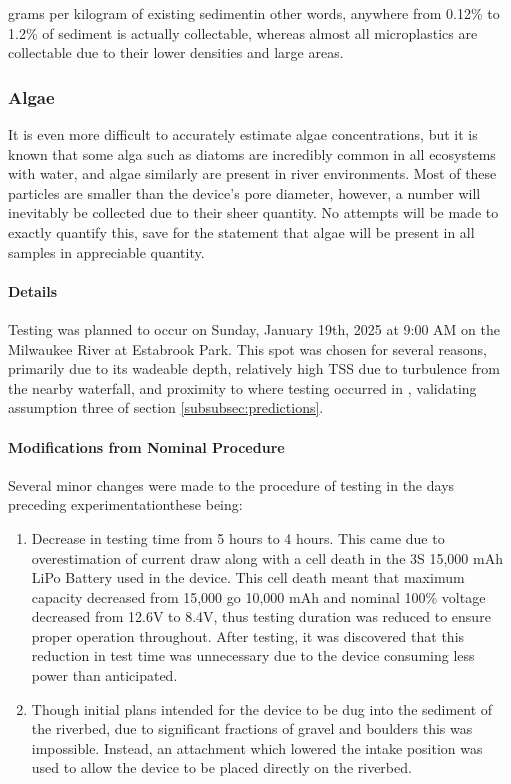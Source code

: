 \documentclass[fleqn,10pt]{SelfArx} %
\begin{document}
grams per kilogram of existing sediment\textemdash in other words, anywhere from 0.12\% to 1.2\% of sediment is actually collectable, whereas almost all microplastics are collectable due to their lower densities and large areas.
	\subsubsection{Algae}
	It is even more difficult to accurately estimate algae concentrations, but it is known that some alga such as diatoms are incredibly common in all ecosystems with water, and algae similarly are present in river environments. Most of these particles are smaller than the device's pore diameter, however, a number will inevitably be collected due to their sheer quantity. No attempts will be made to exactly quantify this, save for the statement that algae will be present in all samples in appreciable quantity. 
	\paragraph*{Details}
	Testing was planned to occur on Sunday, January 19th, 2025 at 9:00 AM on the Milwaukee River at Estabrook Park. This spot was chosen for several reasons, primarily due to its wadeable depth, relatively high TSS due to turbulence from the nearby waterfall, and proximity to where testing occurred in \cite{LenakerEtAlvertdist}, validating assumption three of section \ref{subsubsec:predictions}. 
	\paragraph*{Modifications from Nominal Procedure}
	\label{sec:mods}
	Several minor changes were made to the procedure of testing in the days preceding experimentation\textemdash these being:
	\begin{enumerate}
		\item Decrease in testing time from 5 hours to 4 hours. This came due to overestimation of current draw along with a cell death in the 3S 15,000 mAh LiPo Battery used in the device. This cell death meant that maximum capacity decreased from 15,000 go 10,000 mAh and nominal 100\% voltage decreased from 12.6V to 8.4V, thus testing duration was reduced to ensure proper operation throughout. After testing, it was discovered that this reduction in test time was unnecessary due to the device consuming less power than anticipated. 
		\item Though initial plans intended for the device to be dug into the sediment of the riverbed, due to significant fractions of gravel and boulders this was impossible. Instead, an attachment which lowered the intake position was used to allow the device to be placed directly on the riverbed. 
	\end{enumerate}
\end{document}
